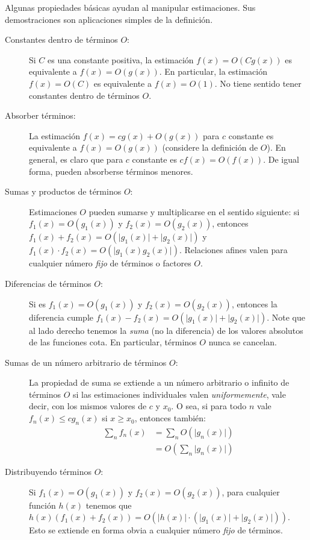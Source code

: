   Algunas propiedades básicas ayudan al manipular estimaciones.
  Sus demostraciones son aplicaciones simples de la definición.

  \begin{description}
  \item[\boldmath Constantes dentro de términos \(O\)\unboldmath:]
    Si \(C\) es una constante positiva,
    la estimación \(f(x) = O(C g(x))\) es equivalente a \(f(x) = O(g(x))\).
    En particular,
    la estimación \(f(x) = O(C)\) es equivalente a \(f(x) = O(1)\).
    No tiene sentido tener constantes dentro de términos \(O\).
  \item[Absorber términos:]
    La estimación \(f(x) = c g(x) + O(g(x))\) para \(c\) constante
    es equivalente a \(f(x) = O(g(x))\)
    (considere la definición de \(O\)).
    En general,
    es claro que para \(c\) constante es \(c f(x) = O(f(x))\).
    De igual forma,
    pueden absorberse términos menores.
  \item[\boldmath Sumas y productos de términos \(O\)\unboldmath:]
    Estimaciones \(O\) pueden sumarse y multiplicarse en el sentido siguiente:
    si \(f_1(x) = O(g_1(x))\) y \(f_2(x) = O(g_2(x))\),
    entonces
     \(f_1(x) + f_2(x) = O(\lvert g_1(x) \rvert + \lvert g_2(x) \rvert)\)
    y
     \(f_1(x) \cdot f_2(x) = O(\lvert g_1(x) g_2(x) \rvert)\).
    Relaciones afines
    valen para cualquier número \emph{fijo} de términos o factores \(O\).
  \item[\boldmath Diferencias de términos \(O\)\unboldmath:]
    Si es \(f_1(x) = O(g_1(x))\) y \(f_2(x) = O(g_2(x))\),
    entonces la diferencia cumple
     \(f_1(x) - f_2(x) = O(\lvert g_1(x) \rvert + \lvert g_2(x) \rvert)\).
    Note que al lado derecho tenemos la \emph{suma}
    (no la diferencia)
    de los valores absolutos de las funciones cota.
    En particular,
    términos \(O\) nunca se cancelan.
  \item[\boldmath Sumas de un número arbitrario de términos \(O\)\unboldmath:]
    La propiedad de suma se extiende a un número arbitrario
    o infinito de términos \(O\)
    si las estimaciones individuales valen \emph{uniformemente},
    vale decir,
    con los mismos valores de \(c\) y \(x_0\).
    O sea,
    si para todo \(n\) vale \(f_n(x) \le c g_n(x)\) si \(x \ge x_0\),
    entonces también:
    \begin{align*}
      \sum_n f_n(x)
        &= \sum_n O(\lvert g_n(x) \rvert) \\
        &= O\left( \sum_n \lvert g_n(x) \rvert \right)
    \end{align*}
  \item[\boldmath Distribuyendo términos \(O\)\unboldmath:]
    Si \(f_1(x) = O(g_1(x))\) y \(f_2(x) = O(g_2(x))\),
    para cualquier función \(h(x)\) tenemos que
    \(h(x) (f_1(x) + f_2(x))
        = O(\lvert h(x) \rvert
             \cdot (\lvert g_1(x) \rvert + \lvert g_2(x) \rvert))\).
    Esto se extiende en forma obvia
    a cualquier número \emph{fijo} de términos.


\end{description}
